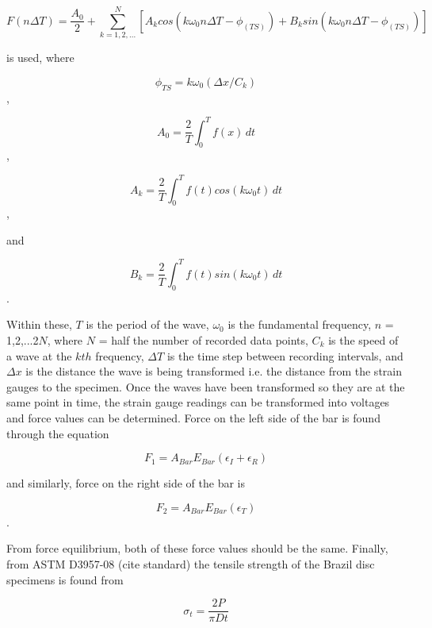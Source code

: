 \documentclass[12pt]{article}
\begin{document}
\begin{equation}
F(n\Delta T) = \frac{A_0}{2} + \sum\limits_{k=1,2,...}^N [A_k cos(k \omega_0 n \Delta T - \phi_(TS)) + B_k sin(k\omega_0 n\Delta T - \phi_(TS))]
\end{equation}

is used, where 

\begin{equation}
\phi_{TS} = k\omega_0(\Delta x/C_k)
\end{equation} ,

\begin{equation}
A_0 = \frac{2}{T} \int_0^T \! f(x) \, dt
\end{equation} ,

\begin{equation}
A_k = \frac{2}{T} \int_0^T \! f(t)cos(k\omega_0t) \, dt
\end{equation} ,

and

\begin{equation}
B_k = \frac{2}{T} \int_0^T \! f(t)sin(k\omega_0t) \, dt
\end{equation} .

Within these, $T$ is the period of the wave, $\omega_0$ is the fundamental frequency, $n$ = 1,2,...2$N$, where $N$ = half the number of recorded data points, $C_k$ is the speed of a wave at the $kth$ frequency, $\Delta T$ is the time step between recording intervals, and $\Delta x$ is the distance the wave is being transformed i.e. the distance from the strain gauges to the specimen. Once the waves have been transformed so they are at the same point in time, the strain gauge readings can be transformed into voltages and force values can be determined. Force on the left side of the bar is found through the equation 

\begin{equation}
F_1 = A_{Bar}E_{Bar}(\epsilon_I + \epsilon_R)
\end{equation}

and similarly, force on the right side of the bar is

\begin{equation}
F_2 = A_{Bar}E_{Bar}(\epsilon_T)
\end{equation}.

From force equilibrium, both of these force values should be the same. Finally, from ASTM D3957-08 (cite standard) the tensile strength of the Brazil disc specimens is found from

\begin{equation}
\sigma_t = \frac{2P}{\pi Dt}
\label{eq:stress}
\end{equation}
\end{document}

